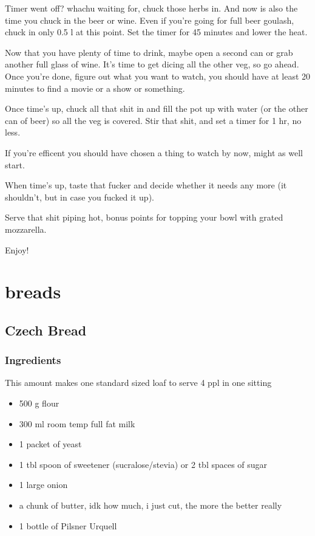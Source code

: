 \documentclass[10pt]{article}
\begin{document}
Timer went off? whachu waiting for, chuck those herbs in. And now is also the time you chuck in the beer or wine. Even if you're going for full beer goulash, chuck in only 0.5 l at this point. Set the timer for 45 minutes and lower the heat.\par
Now that you have plenty of time to drink, maybe open a second can or grab another full glass of wine. It's time to get dicing all the other veg, so go ahead. Once you're done, figure out what you want to watch, you should have at least 20 minutes to find a movie or a show or something.\par
Once time's up, chuck all that shit in and fill the pot up with water (or the other can of beer) so all the veg is covered. Stir that shit, and set a timer for 1 hr, no less.\par
If you're efficent you should have chosen a thing to watch by now, might as well start.\par
When time's up, taste that fucker and decide whether it needs any more (it shouldn't, but in case you fucked it up).\par
Serve that shit piping hot, bonus points for topping your bowl with grated mozzarella.\par
\par
Enjoy!


\section{breads}%
\label{sec:breads}

\subsection{Czech Bread}%
\label{sub:czech_bread}

\subsubsection{Ingredients}%
\label{ssub:czech_bread_ingredients}
This amount makes one standard sized loaf to serve 4 ppl in one sitting

\begin{itemize}
	\item 500 g flour
	\item 300 ml room temp full fat milk
	\item 1 packet of yeast
	\item 1 tbl spoon of sweetener (sucralose/stevia) or 2 tbl spaces of sugar
	\item 1 large onion
	\item a chunk of butter, idk how much, i just cut, the more the better really
	\item 1 bottle of Pilsner Urquell
\end{itemize}
\end{document}
